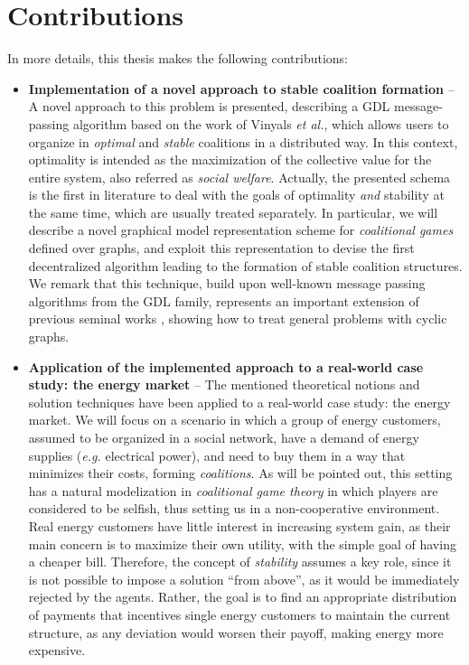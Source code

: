 \documentclass[11pt, twoside, titlepage, a4paper, openright]{report}
\begin{document}
\section{Contributions}

In more details, this thesis makes the following contributions:

\begin{itemize}

\item \textbf{Implementation of a novel approach to stable coalition formation \cite{farinellirogers}} -- A novel approach to this problem is presented, describing a GDL message-passing algorithm based on the work of Vinyals {\em et al.}, which allows users to organize in \textit{optimal} and \textit{stable} coalitions in a distributed way. In this context, optimality is intended as the maximization of the collective value for the entire system, also referred as \textit{social welfare}.
Actually, the presented schema is the first in literature to deal with the goals of optimality \textit{and} stability at the same time, which are usually treated separately.
In particular, we will describe a novel graphical model representation scheme for \textit{coalitional games} defined over graphs, and exploit this representation to devise the first decentralized algorithm leading to the formation of stable coalition structures. 
We remark that this technique, build upon well-known message passing algorithms from the GDL family, represents an important extension of previous seminal works \cite{RePEc:ucp:jpolec:v:112:y:2004:i:4:p:754-778}, showing how to treat general problems with cyclic graphs.

\item \textbf{Application of the implemented approach to a real-world case study: the energy market} -- The mentioned theoretical notions and solution techniques have been applied to a real-world case study: the energy market. We will focus on a scenario in which a group of energy customers, assumed to be organized in a social network, have a demand of energy supplies (\textit{e.g.} electrical power), and need to buy them in a way that minimizes their costs, forming \textit{coalitions}.
As will be pointed out, this setting has a natural modelization in \textit{coalitional game theory} in which players are considered to be selfish, thus setting us in a non-cooperative environment. Real energy customers have little interest in increasing system gain, as their main concern is to maximize their own utility, with the simple goal of having a cheaper bill. Therefore, the concept of \textit{stability} assumes a key role, since it is not possible to impose a solution ``from above'', as it would be immediately rejected by the agents. 
Rather, the goal is to find an appropriate distribution of payments that incentives single energy customers to maintain the current structure, as any deviation would worsen their payoff, making energy more expensive.


\end{itemize}
\end{document}
